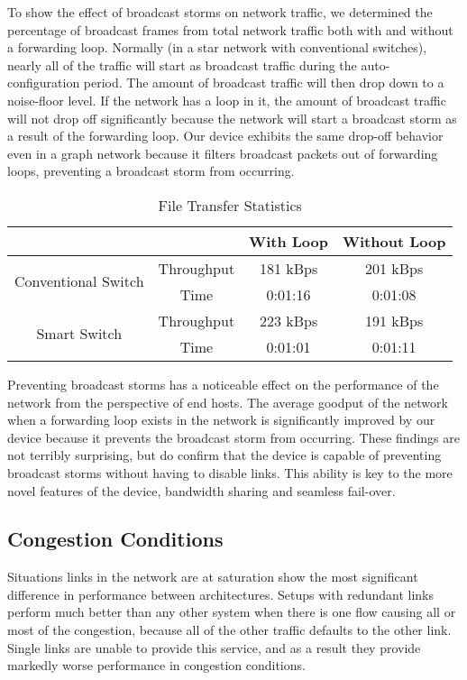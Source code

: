     To show the effect of broadcast storms on network traffic, we determined the percentage of broadcast frames from total network traffic both with and without a forwarding loop.
    Normally (in a star network with conventional switches), nearly all of the traffic will start as broadcast traffic during the auto-configuration period.
    The amount of broadcast traffic will then drop down to a noise-floor level.
    If the network has a loop in it, the amount of broadcast traffic will not drop off significantly because the network will start a broadcast storm as a result of the forwarding loop.
    Our device exhibits the same drop-off behavior even in a graph network because it filters broadcast packets out of forwarding loops, preventing a broadcast storm from occurring.

    \begin{table}[ht]
	    \centering
	    \caption{File Transfer Statistics}
	    \label{tab:throughput}
	    \begin{tabular}{|c|c|c|c|}
		    \hline
		    \multicolumn{2}{|c|}{} & With Loop	& Without Loop \\
		    \hline
		    \multirow{2}{*}{Conventional Switch}& Throughput	& 181 kBps	& 201 kBps \\ \cline{2-4}
		    & Time	& 0:01:16	& 0:01:08 \\
		    \hline
		    \multirow{2}{*}{Smart Switch}	& Throughput	& 223 kBps	& 191 kBps \\ \cline{2-4}
		    & Time	& 0:01:01	& 0:01:11\\
		    \hline
	    \end{tabular}
    \end{table}

    Preventing broadcast storms has a noticeable effect on the performance of the network from the perspective of end hosts.
    The average goodput of the network when a forwarding loop exists in the network is significantly improved by our device because it prevents the broadcast storm from occurring.
    These findings are not terribly surprising, but do confirm that the device is capable of preventing broadcast storms without having to disable links.
    This ability is key to the more novel features of the device, bandwidth sharing and seamless fail-over.

  \subsection{Congestion Conditions}
    Situations links in the network are at saturation show the most significant difference in performance between architectures.
    Setups with redundant links perform much better than any other system when there is one flow causing all or most of the congestion, because all of  the other traffic defaults to the other link.
    Single links are unable to provide this service, and as a result they provide markedly worse performance in congestion conditions.

